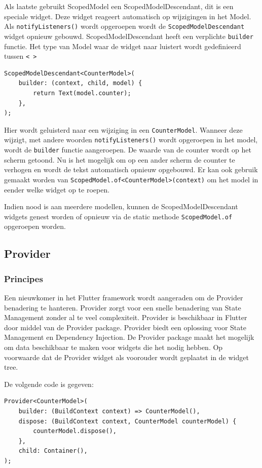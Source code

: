 Als laatste gebruikt ScopedModel een ScopedModelDescendant, dit is een speciale widget. Deze widget reageert automatisch op wijzigingen in het Model. Als \verb|notifyListeners()| wordt opgeroepen wordt de \verb|ScopedModelDescendant| widget opnieuw gebouwd.
ScopedModelDescendant heeft een verplichte \verb|builder| functie. Het type van Model waar de widget naar luistert wordt gedefinieerd tussen \verb|< >|
\begin{verbatim}
ScopedModelDescendant<CounterModel>(
    builder: (context, child, model) {
        return Text(model.counter);
    },
);
\end{verbatim}
Hier wordt geluisterd naar een wijziging in een \verb|CounterModel|. Wanneer deze wijzigt, met andere woorden \verb|notifyListeners()| wordt opgeroepen in het model, wordt de \verb|builder| functie aangeroepen. De waarde van de counter wordt op het scherm getoond. Nu is het mogelijk om op een ander scherm de counter te verhogen en wordt de tekst automatisch opnieuw opgebouwd. Er kan ook gebruik gemaakt worden van \verb|ScopedModel.of<CounterModel>(context)| om het model in eender welke widget op te roepen. 

Indien nood is aan meerdere modellen, kunnen de ScopedModelDescendant widgets genest worden of opnieuw via de static methode \verb|ScopedModel.of| opgeroepen worden.

\subsection{Provider}
\subsubsection{Principes}
Een nieuwkomer in het Flutter framework wordt aangeraden om de Provider benadering te hanteren. Provider zorgt voor een snelle benadering van State Management zonder al te veel complexiteit. Provider is beschikbaar in Flutter door middel van de Provider package. Provider biedt een oplossing voor State Management en Dependency Injection.
De Provider package maakt het mogelijk om data beschikbaar te maken voor widgets die het nodig hebben. Op voorwaarde dat de Provider widget als voorouder wordt geplaatst in de widget tree.

De volgende code is gegeven:
\begin{verbatim}
Provider<CounterModel>(
    builder: (BuildContext context) => CounterModel(),
    dispose: (BuildContext context, CounterModel counterModel) {
        counterModel.dispose(),
    },
    child: Container(),
);
\end{verbatim}

